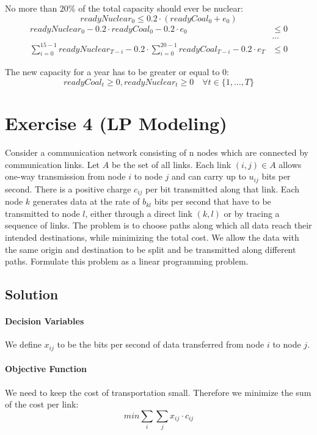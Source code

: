 \documentclass[a4paper, 12pt]{report}
\begin{document}
No more than 20\% of the total capacity should ever be nuclear:
\[
    readyNuclear_0 ≤ 0.2 · (readyCoal_0 + e_0)
\]
\begin{align*}
    readyNuclear_0 - 0.2 · readyCoal_0 - 0.2 · e_0 &≤ 0\\
                                                   &…\\
    ∑_{i=0}^{15-1} readyNuclear_{T-i} -
    0.2 · ∑_{i=0}^{20-1} readyCoal_{T-i} -
    0.2 · e_T                                      &≤ 0
\end{align*}

The new capacity for a year has to be greater or equal to 0:
\[
    readyCoal_t ≥ 0, readyNuclear_t ≥0 \quad ∀ t ∈ \{1,…,T\}
\]

\section{Exercise 4 (LP Modeling)}

Consider a communication network consisting of n nodes which are connected by
communication links. Let $A$ be the set of all links. Each link $(i,j) ∈ A$
allows one-way transmission from node $i$ to node $j$ and can carry up to
$u_{ij}$ bits per second. There is a positive charge $c_{ij}$ per bit
transmitted along that link. Each node $k$ generates data at the rate of
$b_{kl}$ bits per second that have to be transmitted to node $l$, either
through a direct link $(k,l)$ or by tracing a sequence of links. The problem is
to choose paths along which all data reach their intended destinations, while
minimizing the total cost. We allow the data with the same origin and
destination to be split and be transmitted along different paths. Formulate
this problem as a linear programming problem.

\subsection{Solution}

\paragraph{Decision Variables} We define $x_{ij}$ to be the bits per second of
data transferred from node $i$ to node $j$.

\paragraph{Objective Function} We need to keep the cost of transportation
small. Therefore we minimize the sum of the cost per link:
\[
    min ∑_{i}∑_{j} x_{ij} · c_{ij}
\]
\end{document}
